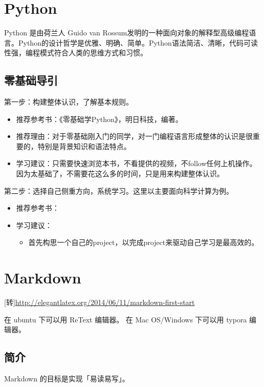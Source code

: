 \chapter{Python}
Python 是由荷兰人 Guido van Rossum发明的一种面向对象的解释型高级编程语言。Python的设计哲学是优雅、明确、简单。Python语法简洁、清晰，代码可读性强，编程模式符合人类的思维方式和习惯。



\section{零基础导引}
第一步：构建整体认识，了解基本规则。
\begin{itemize}
\item 推荐参考书：《零基础学Python》，明日科技，编著。

\item 推荐理由：对于零基础刚入门的同学，对一门编程语言形成整体的认识是很重要的，特别是背景知识和语法特点。

\item 学习建议：只需要快速浏览本书，不看提供的视频，不follow任何上机操作。因为太基础了，不需要花这么多的时间，只是用来构建整体认识。
\end{itemize}

第二步：选择自己侧重方向，系统学习。这里以主要面向科学计算为例。
\begin{itemize}
\item 推荐参考书：

\item 学习建议：
	\begin{itemize}
	\item 首先构思一个自己的project，以完成project来驱动自己学习是最高效的。
	\end{itemize}
\end{itemize}



\chapter{Markdown}
[转]\url{http://elegantlatex.org/2014/06/11/markdown-first-start}

在 ubuntu 下可以用 ReText 编辑器。
在 Mac OS/Windows 下可以用 typora 编辑器。

\section{简介}
Markdown 的目标是实现「易读易写」。

